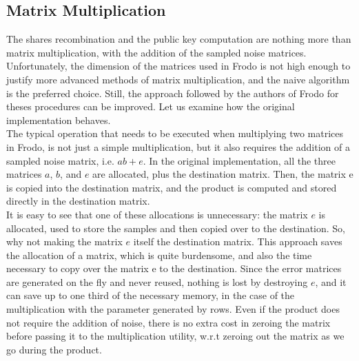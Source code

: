 \subsection{Matrix Multiplication}\label{sec:imp:mult}
The shares recombination and the public key computation are nothing more than matrix multiplication, with the addition of the sampled noise matrices. Unfortunately, the dimension of the matrices used in Frodo is not high enough to justify more advanced methods of matrix multiplication, and the naive algorithm is the preferred choice. Still, the approach followed by the authors of Frodo for theses procedures can be improved. Let us examine how the original implementation behaves.\\
The typical operation that needs to be executed when multiplying two matrices in Frodo, is not just a simple multiplication, but it also requires the addition of a sampled noise matrix, i.e. $ab + e$. In the original implementation, all the three matrices $a$, $b$, and $e$ are allocated, plus the destination matrix. Then, the matrix e is copied into the destination matrix, and the product is computed and stored directly in the destination matrix.\\
It is easy to see that one of these allocations is unnecessary: the matrix $e$ is allocated, used to store the samples and then copied over to the destination. So, why not making the matrix $e$ itself the destination matrix. This approach saves the allocation of a matrix, which is quite burdensome, and also the time necessary to copy over the matrix e to the destination. Since the error matrices are generated on the fly and never reused, nothing is lost by destroying $e$, and it can save up to one third of the necessary memory, in the case of the multiplication with the parameter generated by rows. Even if the product does not require the addition of noise, there is no extra cost in zeroing the matrix before passing it to the multiplication utility, w.r.t zeroing out the matrix as we go during the product.\\
